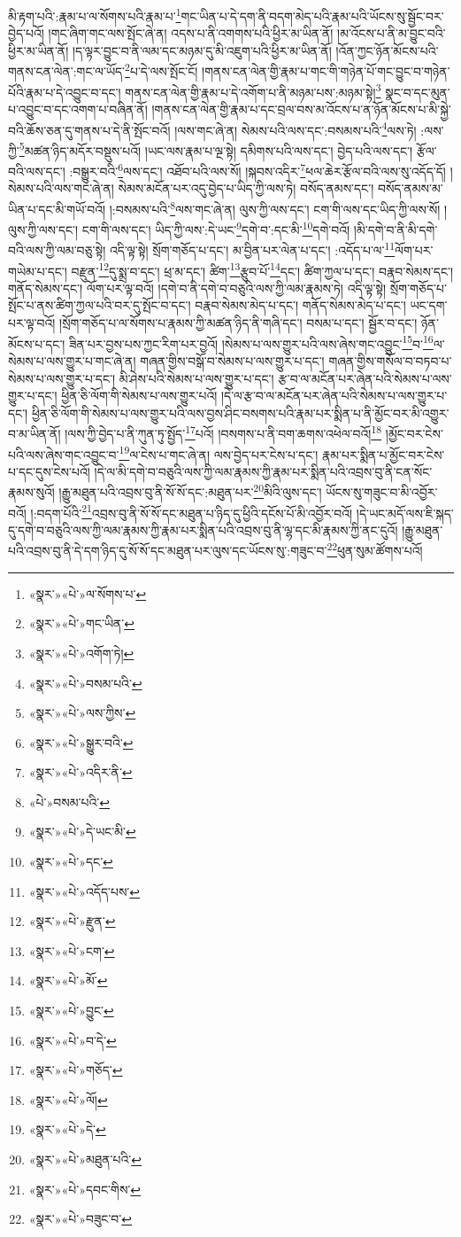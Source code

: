 མི་རྟག་པའི་:རྣམ་པ་ལ་སོགས་པའི་རྣམ་པ་\footnote{«སྣར་»«པེ་»ལ་སོགས་པ་}གང་ཡིན་པ་དེ་དག་ནི་བདག་མེད་པའི་རྣམ་པའི་ཡོངས་སུ་སྦྱོང་བར་བྱེད་པའོ། །གང་ཞིག་གང་ལས་སྤོང་ཞེ་ན། འདས་པ་ནི་འགགས་པའི་ཕྱིར་མ་ཡིན་ནོ། །མ་འོངས་པ་ནི་མ་བྱུང་བའི་ཕྱིར་མ་ཡིན་ནོ། །ད་ལྟར་བྱུང་བ་ནི་ལམ་དང་མཉམ་དུ་མི་འཇུག་པའི་ཕྱིར་མ་ཡིན་ནོ། །འོན་ཀྱང་ཉོན་མོངས་པའི་གནས་ངན་ལེན་:གང་ལ་ཡོད་\footnote{«སྣར་»«པེ་»གང་ཡིན་}པ་དེ་ལས་སྤོང་ངོ། །གནས་ངན་ལེན་གྱི་རྣམ་པ་གང་གི་གཉེན་པོ་གང་བྱུང་བ་གཉེན་པོའི་རྣམ་པ་དེ་འབྱུང་བ་དང་། གནས་ངན་ལེན་གྱི་རྣམ་པ་དེ་འགོག་པ་ནི་མཉམ་པས་:མཉམ་སྟེ།\footnote{«སྣར་»«པེ་»འགོག་ཏེ།} སྣང་བ་དང་མུན་པ་འབྱུང་བ་དང་འགག་པ་བཞིན་ནོ། །གནས་ངན་ལེན་གྱི་རྣམ་པ་དང་བྲལ་བས་མ་འོངས་པ་ན་ཉོན་མོངས་པ་མི་སྐྱེ་བའི་ཆོས་ཅན་དུ་གནས་པ་དེ་ནི་སྤོང་བའོ། །ལས་གང་ཞེ་ན། སེམས་པའི་ལས་དང་:བསམས་པའི་\footnote{«སྣར་»«པེ་»བསམ་པའི་}ལས་ཏེ། :ལས་ཀྱི་\footnote{«སྣར་»«པེ་»ལས་ཀྱིས་}མཚན་ཉིད་མདོར་བསྡུས་པའོ། །ཡང་ལས་རྣམ་པ་ལྔ་སྟེ། དམིགས་པའི་ལས་དང་། བྱེད་པའི་ལས་དང་། རྩོལ་བའི་ལས་དང་། :བསྒྱུར་བའི་\footnote{«སྣར་»«པེ་»སྒྱུར་བའི་}ལས་དང་། འཐོབ་པའི་ལས་སོ། །སྐབས་འདིར་\footnote{«སྣར་»«པེ་»འདིར་ནི་}ཕལ་ཆེར་རྩོལ་བའི་ལས་སུ་འདོད་དོ། །སེམས་པའི་ལས་གང་ཞེ་ན། སེམས་མངོན་པར་འདུ་བྱེད་པ་ཡིད་ཀྱི་ལས་ཏེ། བསོད་ནམས་དང་། བསོད་ནམས་མ་ཡིན་པ་དང་མི་གཡོ་བའོ། །:བསམས་པའི་\footnote{«པེ་»བསམ་པའི་}ལས་གང་ཞེ་ན། ལུས་ཀྱི་ལས་དང་། ངག་གི་ལས་དང་ཡིད་ཀྱི་ལས་སོ། །ལུས་ཀྱི་ལས་དང་། ངག་གི་ལས་དང་། ཡིད་ཀྱི་ལས་:དེ་ཡང་\footnote{«སྣར་»«པེ་»དེ་ཡང་མི་}དགེ་བ་:དང་མི་\footnote{«སྣར་»«པེ་»དང་}དགེ་བའོ། །མི་དགེ་བ་ནི་མི་དགེ་བའི་ལས་ཀྱི་ལམ་བཅུ་སྟེ། འདི་ལྟ་སྟེ། སྲོག་གཅོད་པ་དང་། མ་བྱིན་པར་ལེན་པ་དང་། :འདོད་པ་ལ་\footnote{«སྣར་»«པེ་»འདོད་པས་}ལོག་པར་གཡེམ་པ་དང་། བརྫུན་\footnote{«སྣར་»«པེ་»རྫུན་}དུ་སྨྲ་བ་དང་། ཕྲ་མ་དང་། ཚིག་\footnote{«སྣར་»«པེ་»ངག་}རྩུབ་པོ་\footnote{«སྣར་»«པེ་»མོ་}དང་། ཚིག་ཀྱལ་པ་དང་། བརྣབ་སེམས་དང་། གནོད་སེམས་དང་། ལོག་པར་ལྟ་བའོ། །དགེ་བ་ནི་དགེ་བ་བཅུའི་ལས་ཀྱི་ལམ་རྣམས་ཏེ། འདི་ལྟ་སྟེ། སྲོག་གཅོད་པ་སྤོང་པ་ནས་ཚིག་ཀྱལ་པའི་བར་དུ་སྤོང་བ་དང་། བརྣབ་སེམས་མེད་པ་དང་། གནོད་སེམས་མེད་པ་དང་། ཡང་དག་པར་ལྟ་བའོ། །སྲོག་གཅོད་པ་ལ་སོགས་པ་རྣམས་ཀྱི་མཚན་ཉིད་ནི་གཞི་དང་། བསམ་པ་དང་། སྦྱོར་བ་དང་། ཉོན་མོངས་པ་དང་། ཟིན་པར་བྱས་པས་ཀྱང་རིག་པར་བྱའོ། །སེམས་པ་ལས་གྱུར་པའི་ལས་ཞེས་གང་འབྱུང་\footnote{«སྣར་»«པེ་»བྱུང་}བ་\footnote{«སྣར་»«པེ་»བ་དེ་}ལ་སེམས་པ་ལས་གྱུར་པ་གང་ཞེ་ན། གཞན་གྱིས་བསྒོ་བ་སེམས་པ་ལས་གྱུར་པ་དང་། གཞན་གྱིས་གསོལ་བ་བཏབ་པ་སེམས་པ་ལས་གྱུར་པ་དང་། མི་ཤེས་པའི་སེམས་པ་ལས་གྱུར་པ་དང་། རྩ་བ་ལ་མངོན་པར་ཞེན་པའི་སེམས་པ་ལས་གྱུར་པ་དང་། ཕྱིན་ཅི་ལོག་གི་སེམས་པ་ལས་གྱུར་པའོ། །དེ་ལ་རྩ་བ་ལ་མངོན་པར་ཞེན་པའི་སེམས་པ་ལས་གྱུར་པ་དང་། ཕྱིན་ཅི་ལོག་གི་སེམས་པ་ལས་གྱུར་པའི་ལས་བྱས་ཤིང་བསགས་པའི་རྣམ་པར་སྨིན་པ་ནི་མྱོང་བར་མི་འགྱུར་བ་མ་ཡིན་ནོ། །ལས་ཀྱི་བྱེད་པ་ནི་ཀུན་ཏུ་སྤྱོད་\footnote{«སྣར་»«པེ་»གཅོད་}པའོ། །བསགས་པ་ནི་བག་ཆགས་འཕེལ་བའོ།\footnote{«སྣར་»«པེ་»ལོ།} །མྱོང་བར་ངེས་པའི་ལས་ཞེས་གང་འབྱུང་བ་\footnote{«སྣར་»«པེ་»དེ་}ལ་ངེས་པ་གང་ཞེ་ན། ལས་བྱེད་པར་ངེས་པ་དང་། རྣམ་པར་སྨིན་པ་མྱོང་བར་ངེས་པ་དང་དུས་ངེས་པའོ། །དེ་ལ་མི་དགེ་བ་བཅུའི་ལས་ཀྱི་ལམ་རྣམས་ཀྱི་རྣམ་པར་སྨིན་པའི་འབྲས་བུ་ནི་ངན་སོང་རྣམས་སུའོ། །རྒྱུ་མཐུན་པའི་འབྲས་བུ་ནི་སོ་སོ་དང་:མཐུན་པར་\footnote{«སྣར་»«པེ་»མཐུན་པའི་}མིའི་ལུས་དང་། ཡོངས་སུ་གཟུང་བ་མི་འབྱོར་བའོ། །:བདག་པོའི་\footnote{«སྣར་»«པེ་»དབང་གིས་}འབྲས་བུ་ནི་སོ་སོ་དང་མཐུན་པ་ཉིད་དུ་ཕྱིའི་དངོས་པོ་མི་འབྱོར་བའོ། །དེ་ཡང་མདོ་ལས་ཇི་སྐད་དུ་དགེ་བ་བཅུའི་ལས་ཀྱི་ལམ་རྣམས་ཀྱི་རྣམ་པར་སྨིན་པའི་འབྲས་བུ་ནི་ལྷ་དང་མི་རྣམས་ཀྱི་ནང་དུའོ། །རྒྱུ་མཐུན་པའི་འབྲས་བུ་ནི་དེ་དག་ཉིད་དུ་སོ་སོ་དང་མཐུན་པར་ལུས་དང་ཡོངས་སུ་:གཟུང་བ་\footnote{«སྣར་»«པེ་»བཟུང་བ་}ཕུན་སུམ་ཚོགས་པའོ། 